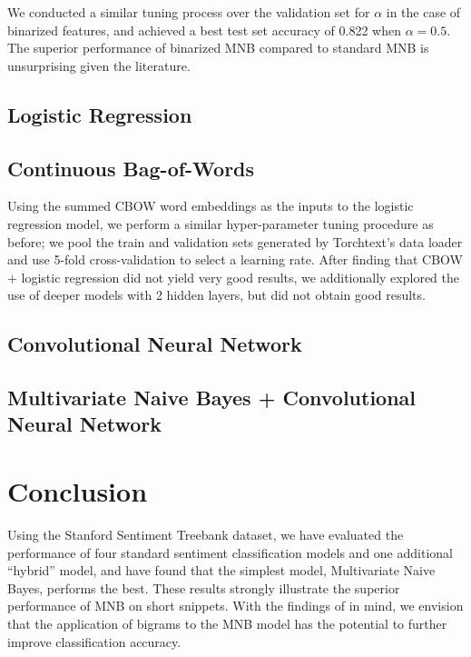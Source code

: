 \documentclass[11pt]{article}
\begin{document}
We conducted a similar tuning process over the validation set for $\alpha$ in the case of binarized features, and achieved a best test set accuracy of 0.822 when $\alpha = 0.5$. The superior performance of binarized MNB compared to standard MNB is unsurprising given the literature.

\subsection{Logistic Regression}

\subsection{Continuous Bag-of-Words}
Using the summed CBOW word embeddings as the inputs to the logistic regression model, we perform a similar hyper-parameter tuning procedure as before; we pool the train and validation sets generated by Torchtext's data loader and use 5-fold cross-validation to select a learning rate. After finding that CBOW + logistic regression did not yield very good results, we additionally explored the use of deeper models with 2 hidden layers, but did not obtain good results.

\subsection{Convolutional Neural Network}

\subsection{Multivariate Naive Bayes + Convolutional Neural Network}


\section{Conclusion}
Using the Stanford Sentiment Treebank dataset, we have evaluated the performance of four standard sentiment classification models and one additional ``hybrid'' model, and have found that the simplest model, Multivariate Naive Bayes, performs the best. These results strongly illustrate the superior performance of MNB on short snippets. With the findings of \citeauthor{wang2012baselines} in mind, we envision that the application of bigrams to the MNB model has the potential to further improve classification accuracy.



\nocite{*}

\end{document}
